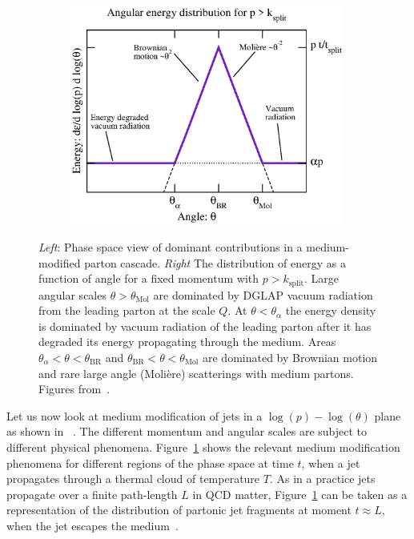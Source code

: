 \begin{figure}[tb]
\begin{subfigure}{0.48\textwidth}
\end{subfigure}
\begin{subfigure}{0.48\textwidth}
\includegraphics[width=0.99\textwidth]{figures/e-vs-th3.eps}
\end{subfigure}
\caption{{\it Left}: Phase space view of dominant contributions in a medium-modified parton cascade. {\it Right} The distribution of energy as a function of angle for a fixed momentum with $p > k_\mathrm{split}$. Large angular scales $\theta > \theta_\mathrm{Mol}$ are dominated by DGLAP vacuum radiation from the leading parton at the scale $Q$. At $\theta < \theta_\alpha$ the energy density is dominated by vacuum radiation of the leading parton after it has degraded its energy propagating through the medium. Areas $\theta_\alpha < \theta < \theta_\mathrm{BR}$ and $\theta_\mathrm{BR} < \theta < \theta_\mathrm{Mol}$ are dominated by Brownian motion and rare large angle (Moli\`ere) scatterings with medium partons. Figures from~\cite{Kurkela:2014tla}.}
\label{fig:cascades}
\end{figure}

Let us now look at medium modification of jets in a $\log\left(p\right)-\log\left(\theta\right)$ plane as shown in ~\cite{Kurkela:2014tla}. The different momentum and angular scales are subject to different physical phenomena. Figure~\ref{fig:cascades} shows the relevant medium modification phenomena for different regions of the phase space at time $t$, when a jet propagates through a thermal cloud of temperature $T$. As in a practice jets propagate over a finite path-length $L$ in QCD matter, Figure~\ref{fig:cascades} can be taken as a representation of the distribution of partonic jet fragments at moment $t \approx L$, when the jet escapes the medium~\cite{Kurkela:2014tla}.

